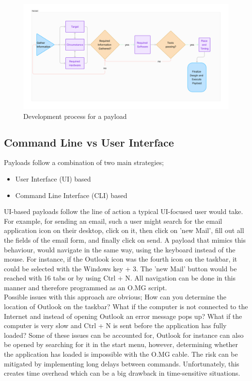 \begin{figure}[H]
    \centering
    \includegraphics[width=1.1\linewidth]{visuals/Attack Development(1).png}
    \caption{Development process for a payload}
    \label{Flow Diagram Development process payload}
\end{figure}



\subsection{Command Line vs User Interface}

Payloads follow a combination of two main strategies; 
\begin{itemize}
    \item User Interface (UI) based
    \item Command Line Interface (CLI) based
\end{itemize}

UI-based payloads follow the line of action a typical UI-focused user would take. For example, for sending an email, such a user might search for the email application icon on their desktop, click on it, then click on 'new Mail', fill out all the fields of the email form, and finally click on send. A payload that mimics this behaviour, would navigate in the same way, using the keyboard instead of the mouse. For instance, if the Outlook icon was the fourth icon on the taskbar, it could be selected with the Windows key + 3. The 'new Mail' button would be reached with 16 tabs or by using  Ctrl + N. All navigation can be done in this manner and therefore programmed as an O.MG script. \\
Possible issues with this approach are obvious; How can you determine the location of Outlook on the taskbar? What if the computer is not connected to the Internet and instead of opening Outlook an error message pops up? What if the computer is very slow and  Ctrl + N is sent before the application has fully loaded?  Some of these issues can be accounted for, Outlook for instance can also be opened by searching for it in the start menu, however, determining whether the application has loaded is impossible with the O.MG cable. The risk can be mitigated by implementing long delays between commands. Unfortunately, this creates time overhead which can be a big drawback in time-sensitive situations. \\

